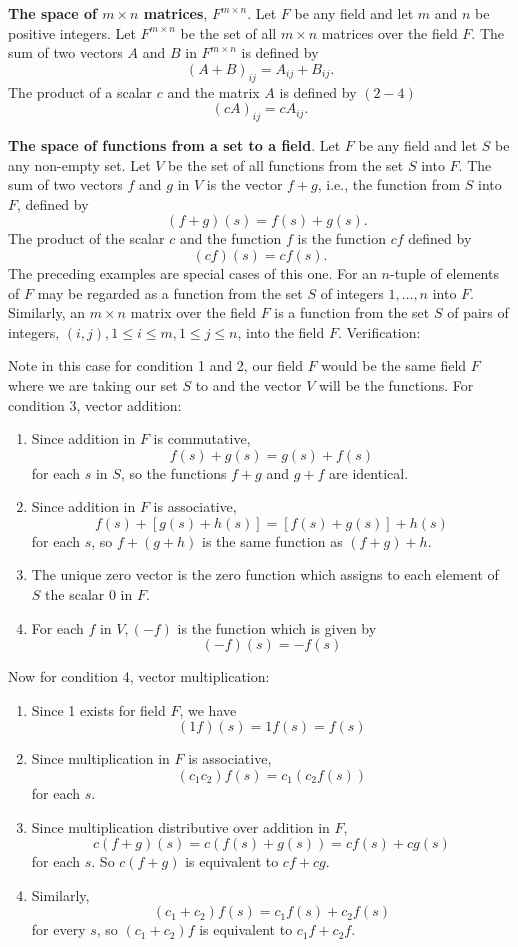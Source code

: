 \documentclass[main.tex]{subfiles}
\begin{document}
\begin{example}
\textbf{The space of $m \times n$ matrices}, $F^{m \times n}$. Let $F$ be any field and let $m$ and $n$ be positive integers. Let $F^{m \times n}$ be the set of all $m \times n$ matrices over the field $F$. The sum of two vectors $A$ and $B$ in $F^{m \times n}$ is defined by
$$
(A+B)_{i j}=A_{i j}+B_{i j} .
$$
The product of a scalar $c$ and the matrix $A$ is defined by $(2-4)$
$$
(c A)_{i j}=c A_{i j} .
$$
\end{example}

\begin{example}\label{space_of_functions_from_set_to_field}
\textbf{The space of functions from a set to a field}. Let $F$ be any field and let $S$ be any non-empty set. Let $V$ be the set of all functions from the set $S$ into $F$. The sum of two vectors $f$ and $g$ in $V$ is the vector $f+g$, i.e., the function from $S$ into $F$, defined by
$$\quad(f+g)(s)=f(s)+g(s).$$
The product of the scalar $c$ and the function $f$ is the function $c f$ defined by
$$
(c f)(s)=c f(s) .
$$
The preceding examples are special cases of this one. For an $n$-tuple of elements of $F$ may be regarded as a function from the set $S$ of integers $1, \ldots, n$ into $F$. Similarly, an $m \times n$ matrix over the field $F$ is a function from the set $S$ of pairs of integers, $(i, j), 1 \leq i \leq m, 1 \leq j \leq n$, into the field $F$. Verification:

Note in this case for condition 1 and 2, our field $F$ would be the same field $F$ where we are taking our set $S$ to and the vector $V$ will be the functions. For condition 3, vector addition:
\begin{enumerate}
    \item Since addition in $F$ is commutative,
    $$
    f(s)+g(s)=g(s)+f(s)
    $$
    for each $s$ in $S$, so the functions $f+g$ and $g+f$ are identical.
    \item Since addition in $F$ is associative,
    $$
    f(s)+[g(s)+h(s)]=[f(s)+g(s)]+h(s)
    $$
    for each $s$, so $f+(g+h)$ is the same function as $(f+g)+h$.
    \item The unique zero vector is the zero function which assigns to each element of $S$ the scalar 0 in $F$.
    \item For each $f$ in $V,(-f)$ is the function which is given by
    $$
    (-f)(s)=-f(s)
    $$
\end{enumerate}
Now for condition 4, vector multiplication:
\begin{enumerate}
    \item Since 1 exists for field $F$, we have $$
    (1f)(s) = 1f(s) = f(s)$$
    \item Since multiplication in $F$ is associative, $$(c_1c_2)f(s) = c_1(c_2f(s))$$ for each $s$. 
    \item Since multiplication distributive over addition in $F$, $$c(f + g)(s) = c(f(s) + g(s)) = cf(s) + cg(s)$$ for each $s$. So $c(f + g)$ is equivalent to $cf + cg$. 
    \item Similarly, $$(c_1 + c_2) f(s) = c_1f(s) + c_2f(s)$$ for every $s$, so $(c_1 + c_2)f$ is equivalent to $c_1f + c_2f$. 
\end{enumerate}
\end{example}
\end{document}
